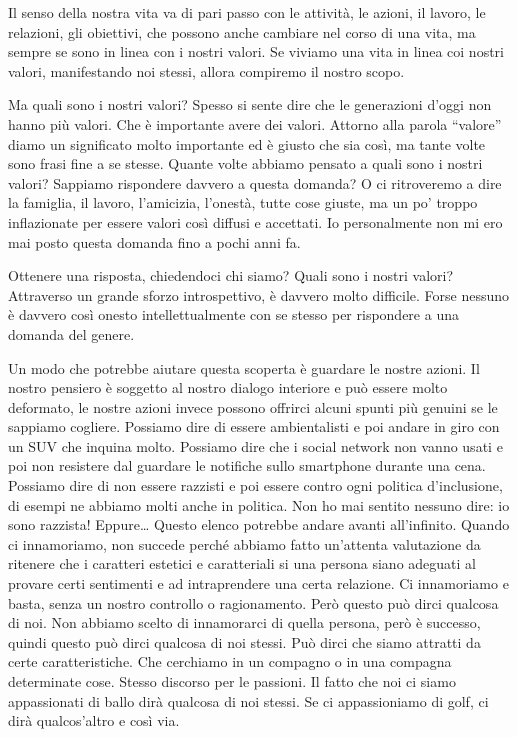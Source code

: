 \documentclass[12pt]{book} %
\begin{document}
\bigskip

Il senso della nostra vita va di pari passo con le attività, le azioni, il lavoro, le relazioni, gli obiettivi, che
possono anche cambiare nel corso di una vita, ma sempre se sono in linea con i nostri valori. Se viviamo una vita in
linea coi nostri valori, manifestando noi stessi, allora compiremo il nostro scopo. 

Ma quali sono i nostri valori? Spesso si sente dire che le generazioni d'oggi non hanno più valori.
Che è importante avere dei valori. Attorno alla parola “valore” diamo un significato molto importante ed è giusto che
sia così, ma tante volte sono frasi fine a se stesse. Quante volte abbiamo pensato a quali sono i nostri valori?
Sappiamo rispondere davvero a questa domanda? O ci ritroveremo a dire la famiglia, il lavoro,
l'amicizia, l'onestà, tutte cose giuste, ma un po' troppo inflazionate per
essere valori così diffusi e accettati. Io personalmente non mi ero mai posto questa domanda fino a pochi anni fa.

Ottenere una risposta, chiedendoci chi siamo? Quali sono i nostri valori? Attraverso un grande sforzo introspettivo, è
davvero molto difficile. Forse nessuno è davvero così onesto intellettualmente con se stesso per rispondere a una
domanda del genere. 

Un modo che potrebbe aiutare questa scoperta è guardare le nostre azioni. Il nostro pensiero è soggetto al nostro
dialogo interiore e può essere molto deformato, le nostre azioni invece possono offrirci alcuni spunti più genuini se
le sappiamo cogliere. Possiamo dire di essere ambientalisti e poi andare in giro con un SUV che inquina molto. Possiamo
dire che i social network non vanno usati e poi non resistere dal guardare le notifiche sullo smartphone durante una
cena. Possiamo dire di non essere razzisti e poi essere contro ogni politica d'inclusione, di
esempi ne abbiamo molti anche in politica. Non ho mai sentito nessuno dire: io sono razzista! Eppure… Questo elenco
potrebbe andare avanti all'infinito. Quando ci innamoriamo, non succede perché abbiamo fatto
un'attenta valutazione da ritenere che i caratteri estetici e caratteriali si una persona siano
adeguati al provare certi sentimenti e ad intraprendere una certa relazione. Ci innamoriamo e basta, senza un nostro
controllo o ragionamento. Però questo può dirci qualcosa di noi. Non abbiamo scelto di innamorarci di quella persona,
però è successo, quindi questo può dirci qualcosa di noi stessi. Può dirci che siamo attratti da certe caratteristiche.
Che cerchiamo in un compagno o in una compagna determinate cose. Stesso discorso per le passioni. Il fatto che noi ci
siamo appassionati di ballo dirà qualcosa di noi stessi. Se ci appassioniamo di golf, ci dirà
qualcos'altro e così via. 
\end{document}
